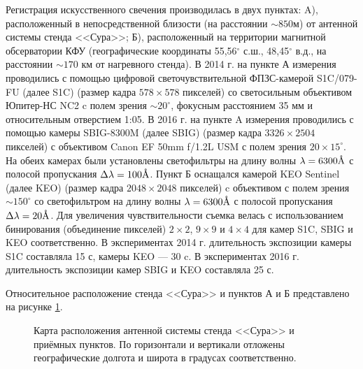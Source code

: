 \documentclass[12pt,a4paper]{article}
\newcommand{\angstrom}{\textup{\AA}}
\begin{document}
Регистрация искусственного свечения производилась в двух пунктах: A), расположенный в непосредственной близости (на расстоянии $\sim850$м) от антенной системы стенда <<Сура>>; Б), расположенный на территории магнитной обсерватории КФУ (географические координаты 55,56$^{\circ}$ с.ш., 48,45$^{\circ}$ в.д., на расстоянии $\sim170$ км от нагревного стенда). В 2014 г. на пункте А измерения проводились с помощью цифровой светочувствительной ФПЗС-камерой S1C/079-FU (далее S1C) \cite{S1C_specs} (размер кадра $578\times578$ пикселей) со светосильным объективом Юпитер-НС NC2 \cite{NC2_specs} c полем зрения $\sim20^{\circ}$, фокусным расстоянием 35 мм и относительным отверстием 1:05. В 2016 г. на пункте A измерения проводились с помощью камеры SBIG-8300M (далее SBIG) \cite{SBIG_specs} (размер кадра $3326\times2504$ пикселей) с объективом Canon EF 50mm f/1.2L USM с полем зрения $20\times15^{\circ}$. На обеих камерах были установлены светофильтры на длину волны $\lambda=6300\angstrom$ с полосой пропускания $\Delta \lambda = 100\angstrom$. Пункт Б оснащался камерой KEO Sentinel (далее KEO) \cite{KEO_specs} (размер кадра $2048\times2048$ пикселей) c объективом с полем зрения $\sim150^{\circ}$ со светофильтром на длину волны $\lambda=6300\angstrom$ с полосой пропускания $\Delta \lambda = 20\angstrom$. 
Для увеличения чувствительности съемка велась с использованием бинирования (объединение пикселей) $2\times2$, $9\times9$ и $4\times4$ для камер S1C, SBIG и KEO соответственно. В экспериментах 2014 г. длительность экспозиции камеры S1C составляла 15 с, камеры KEO --- 30 c. В экспериментах 2016 г. длительность экспозиции камер SBIG и KEO составляла 25 с.


Относительное расположение стенда <<Сура>> и пунктов А и Б представлено на рисунке \ref{fig:fig1}.



\begin{figure}[h]
	\caption{Карта расположения антенной системы стенда <<Сура>> и приёмных пунктов. По горизонтали и вертикали отложены географические долгота и широта в градусах соответственно.}
	\label{fig:fig1}
\end{figure}
\end{document}

